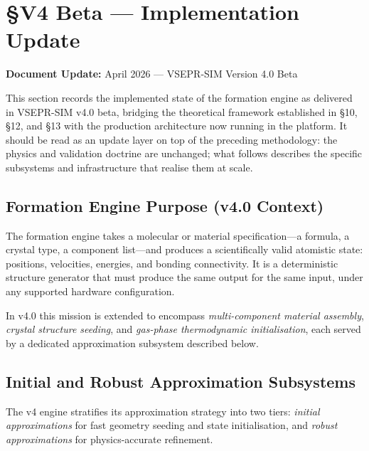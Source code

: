 \documentclass[11pt]{article}
\begin{document}
\section{§V4 Beta — Implementation Update}
\label{sec:v4beta}

\textbf{Document Update:} April 2026 --- VSEPR-SIM Version 4.0 Beta

This section records the implemented state of the formation engine as
delivered in VSEPR-SIM v4.0 beta, bridging the theoretical framework
established in \S{}10, \S{}12, and \S{}13 with the production architecture
now running in the platform. It should be read as an update layer on top of
the preceding methodology: the physics and validation doctrine are unchanged;
what follows describes the specific subsystems and infrastructure that realise
them at scale.

\subsection{Formation Engine Purpose (v4.0 Context)}

The formation engine takes a molecular or material specification---a formula,
a crystal type, a component list---and produces a scientifically valid
atomistic state: positions, velocities, energies, and bonding connectivity.
It is a deterministic structure generator that must produce the same output
for the same input, under any supported hardware configuration.

In v4.0 this mission is extended to encompass \textit{multi-component
material assembly}, \textit{crystal structure seeding}, and
\textit{gas-phase thermodynamic initialisation}, each served by a dedicated
approximation subsystem described below.

\subsection{Initial and Robust Approximation Subsystems}

The v4 engine stratifies its approximation strategy into two tiers:
\textit{initial approximations} for fast geometry seeding and state
initialisation, and \textit{robust approximations} for physics-accurate
refinement.
\end{document}
